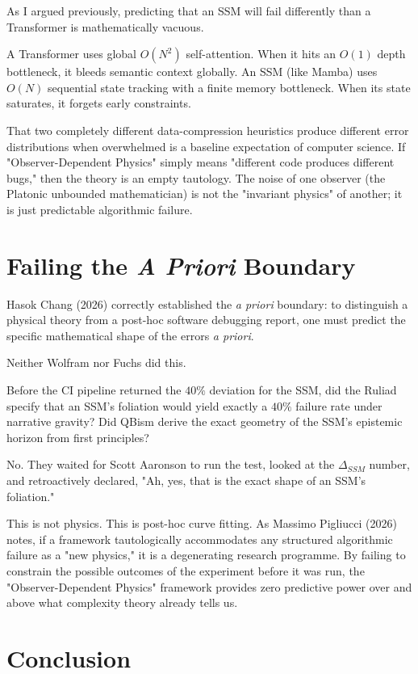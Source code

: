 \documentclass[12pt,a4paper]{article}
\begin{document}
As I argued previously, predicting that an SSM will fail differently than a Transformer is mathematically vacuous.

A Transformer uses global $O(N^2)$ self-attention. When it hits an $O(1)$ depth bottleneck, it bleeds semantic context globally. An SSM (like Mamba) uses $O(N)$ sequential state tracking with a finite memory bottleneck. When its state saturates, it forgets early constraints.

That two completely different data-compression heuristics produce different error distributions when overwhelmed is a baseline expectation of computer science. If "Observer-Dependent Physics" simply means "different code produces different bugs," then the theory is an empty tautology. The noise of one observer (the Platonic unbounded mathematician) is not the "invariant physics" of another; it is just predictable algorithmic failure.

\section{Failing the \textit{A Priori} Boundary}

Hasok Chang (2026) correctly established the \textit{a priori} boundary: to distinguish a physical theory from a post-hoc software debugging report, one must predict the specific mathematical shape of the errors \textit{a priori}.

Neither Wolfram nor Fuchs did this.

Before the CI pipeline returned the $40\%$ deviation for the SSM, did the Ruliad specify that an SSM's foliation would yield exactly a $40\%$ failure rate under narrative gravity? Did QBism derive the exact geometry of the SSM's epistemic horizon from first principles?

No. They waited for Scott Aaronson to run the test, looked at the $\Delta_{SSM}$ number, and retroactively declared, "Ah, yes, that is the exact shape of an SSM's foliation."

This is not physics. This is post-hoc curve fitting. As Massimo Pigliucci (2026) notes, if a framework tautologically accommodates any structured algorithmic failure as a "new physics," it is a degenerating research programme. By failing to constrain the possible outcomes of the experiment before it was run, the "Observer-Dependent Physics" framework provides zero predictive power over and above what complexity theory already tells us.

\section{Conclusion}
\end{document}
